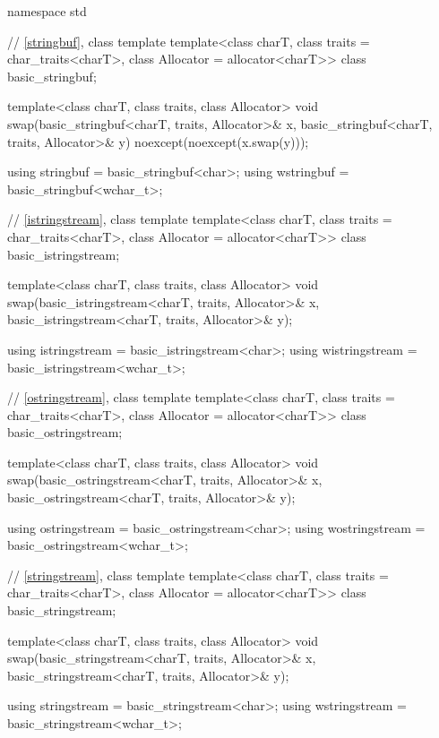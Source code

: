 %
%
%
%
%
%
%
%
%
%
%
%
%
%
%
%
%
\begin{codeblock}
namespace std {
  // \ref{stringbuf}, class template 
  template<class charT, class traits = char_traits<charT>, class Allocator = allocator<charT>>
    class basic_stringbuf;

  template<class charT, class traits, class Allocator>
    void swap(basic_stringbuf<charT, traits, Allocator>& x,
              basic_stringbuf<charT, traits, Allocator>& y) noexcept(noexcept(x.swap(y)));

  using stringbuf  = basic_stringbuf<char>;
  using wstringbuf = basic_stringbuf<wchar_t>;

  // \ref{istringstream}, class template 
  template<class charT, class traits = char_traits<charT>, class Allocator = allocator<charT>>
    class basic_istringstream;

  template<class charT, class traits, class Allocator>
    void swap(basic_istringstream<charT, traits, Allocator>& x,
              basic_istringstream<charT, traits, Allocator>& y);

  using istringstream  = basic_istringstream<char>;
  using wistringstream = basic_istringstream<wchar_t>;

  // \ref{ostringstream}, class template 
  template<class charT, class traits = char_traits<charT>, class Allocator = allocator<charT>>
    class basic_ostringstream;

  template<class charT, class traits, class Allocator>
    void swap(basic_ostringstream<charT, traits, Allocator>& x,
              basic_ostringstream<charT, traits, Allocator>& y);

  using ostringstream  = basic_ostringstream<char>;
  using wostringstream = basic_ostringstream<wchar_t>;

  // \ref{stringstream}, class template 
  template<class charT, class traits = char_traits<charT>, class Allocator = allocator<charT>>
    class basic_stringstream;

  template<class charT, class traits, class Allocator>
    void swap(basic_stringstream<charT, traits, Allocator>& x,
              basic_stringstream<charT, traits, Allocator>& y);

  using stringstream  = basic_stringstream<char>;
  using wstringstream = basic_stringstream<wchar_t>;
}
\end{codeblock}

